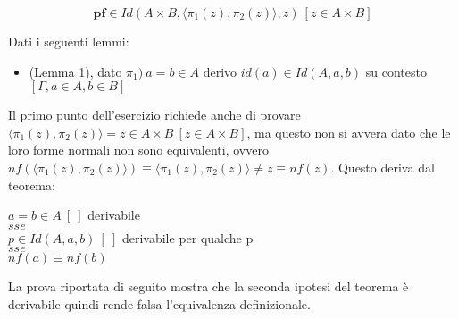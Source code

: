 \begin{displaymath}
    \textbf{pf} \in Id(A \times B, \langle\pi_1(z), \pi_2(z)\rangle, z)\ [z \in A \times B]
\end{displaymath}

Dati i seguenti lemmi:
\begin{itemize}
    \item (Lemma 1), dato $\pi_1)\ a = b \in A$ derivo $id(a) \in Id(A, a, b)$ su contesto $[\Gamma, a \in A, b \in B]$
\end{itemize}
Il primo punto dell'esercizio richiede anche di provare $\langle \pi_1(z), \pi_2(z)\rangle = z \in A \times B\ [z \in A \times B]$, ma questo non si avvera dato che le loro forme normali non sono equivalenti, ovvero $nf(\langle \pi_1(z), \pi_2(z)\rangle) \equiv \langle \pi_1(z), \pi_2(z)\rangle \neq z \equiv nf(z)$.
Questo deriva dal teorema:
\begin{center}
    $a = b \in A\ [\ ]$ derivabile\\
    $sse$\\
    $p \in Id(A, a, b)\ [\ ]$ derivabile per qualche p\\
    $sse$\\
    $nf(a) \equiv nf(b)$
\end{center}
La prova riportata di seguito mostra che la seconda ipotesi del teorema è derivabile quindi rende falsa l'equivalenza definizionale.